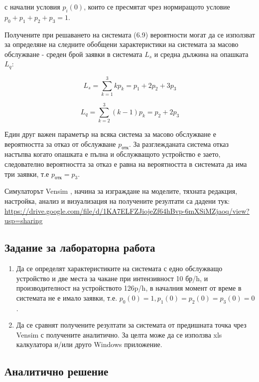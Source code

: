 	с начални условия $p_i(0)$, които се пресмятат чрез нормиращото условие $p_0 + p_1 + p_2 + p_3 = 1$.
	
	Получените при решаването на системата (6.9) вероятности могат да се използват за определяне на следните обобщени характеристики на системата за масово обслужване - среден брой заявки в системата $L_s$ и средна дължина на опашката $L_q$:
	
	\begin{equation}
		L_s = \sum_{k=1}^{3} k p_k = p_1 + 2p_2 + 3p_3 \tag{6.10}
	\end{equation}
	
	\begin{equation}
		L_q = \sum_{k=2}^{3} (k-1) p_k = p_2 + 2p_3 \tag{6.11}
	\end{equation}
	
	Един друг важен параметър на всяка система за масово обслужване е вероятността за отказ от обслужване $p_{отк}$. За разглежданата система отказ настъпва когато опашката е пълна и обслужващото устройство е заето, следователно вероятността за отказ е равна на вероятността в системата да има три заявки, т.е $p_{отк} = p_3$.
	
	Симулаторът Vensim , начина за изграждане на моделите, тяхната редакция, настройка, анализ и визуализация на получените резултати са дадени тук:
	\href{https://drive.google.com/file/d/1KA7ELFZJiojeZf64hBvp-6mXSiMZjaoq/view?usp=sharing}{https://drive.google.com/file/d/1KA7ELFZJiojeZf64hBvp-6mXSiMZjaoq/view?usp=sharing}
	
	
\subsection{Задание за лабораторна работа}

\begin{enumerate}
	\item Да се определят характеристиките на системата с едно обслужващо устройство и две места за чакане при интензивност 10 бр/h, и производителност на устройството 126p/h, в началния момент от време в системата не е имало заявки, т.е. $p_0(0)=1, p_1(0)=p_2(0)=p_3(0)=0$.
	\item Да се сравнят получените резултати за системата от предишната точка чрез Vensim с получените аналитично. За целта може да се използва xls калкулатора и/или друго Windows приложение.
\end{enumerate}

\subsection{Аналитично решение}

